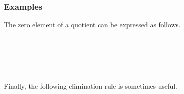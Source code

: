 \subsubsection{Examples}\label{cong-examples}

The zero element of a quotient can be expressed as follows.
\ccpad
\begin{code}%
\>[0]\AgdaSpace{}%
\AgdaModule{\AgdaUnderscore{}}\AgdaSpace{}%
\AgdaSymbol{\{}\AgdaSpace{}%
\AgdaSpace{}%
\AgdaSymbol{:}\AgdaSpace{}%
\AgdaSymbol{\}}\AgdaSpace{}%
\<%
\\
%
\\[\AgdaEmptyExtraSkip]%
\>[0][@{}l@{\AgdaIndent{0}}]%
\>[1]\AgdaSpace{}%
\AgdaSymbol{:}\AgdaSpace{}%
\AgdaSymbol{\{}\AgdaSpace{}%
\AgdaSymbol{:}\AgdaSpace{}%
\AgdaSpace{}%
\AgdaSpace{}%
\AgdaSymbol{\}(}\AgdaSpace{}%
\AgdaSymbol{:}\AgdaSpace{}%
\AgdaSymbol{\{}\AgdaSymbol{\}\{}\AgdaSymbol{\}}\AgdaSpace{}%
\AgdaSymbol{)}\AgdaSpace{}%
\AgdaSpace{}%
\AgdaSpace{}%
\AgdaSymbol{(}\AgdaSpace{}%
\AgdaSpace{}%
\AgdaSpace{}%
\AgdaOperator{\AgdaFunction{/}}\AgdaSpace{}%
\AgdaSpace{}%
\AgdaSpace{}%
\AgdaSymbol{)(}\AgdaSpace{}%
\AgdaSpace{}%
\AgdaSpace{}%
\AgdaSymbol{)}\<%
\\
%
\\[\AgdaEmptyExtraSkip]%
%
\>[1]\AgdaSpace{}%
\AgdaSpace{}%
\AgdaSymbol{=}\AgdaSpace{}%
\AgdaSpace{}%
\AgdaSpace{}%
\AgdaSpace{}%
\AgdaSpace{}%
\AgdaSpace{}%
\AgdaSpace{}%
\<%
\end{code}
\ccpad
Finally, the following elimination rule is sometimes useful.
\ccpad
